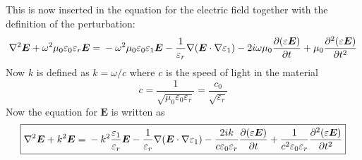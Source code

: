 \documentclass[10pt,a4paper]{eitExjobb}
\begin{document}
	This is now inserted in the equation for the electric field together with the definition of the perturbation:
	\begin{equation*}
	\nabla^2\bm{E} + \omega^2 \mu_0 \varepsilon_0 \varepsilon_r \bm{E} = \\
	-\omega^2 \mu_0 \varepsilon_0 \varepsilon_1 \bm{E} -\frac{1}{\varepsilon_r}\nabla(\bm{E} \cdot \nabla \varepsilon_1) - 2i\omega \mu_0 \frac{\partial (\varepsilon \bm{E})}{\partial t} + \mu_0 \frac{\partial^2 (\varepsilon \bm{E})}{\partial t^2}
	\end{equation*}
	Now $k$ is defined as $k = \omega/c$ where $c$ is the speed of light in the material
	\begin{equation*}
	c = \frac{1}{\sqrt{\mu_0 \varepsilon_0 \varepsilon_r}} = \frac{c_0}{\sqrt{\varepsilon_r}}
	\end{equation*}
	Now the equation for $\bm{E}$ is written as
	\begin{equation*}
	\boxed{
		\nabla^2\bm{E} + k^2 \bm{E} = \\
		-k^2 \frac{\varepsilon_1}{\varepsilon_r} \bm{E} -\frac{1}{\varepsilon_r}\nabla(\bm{E} \cdot \nabla \varepsilon_1) - \frac{2ik}{c\varepsilon_0\varepsilon_r} \frac{\partial (\varepsilon \bm{E})}{\partial t} + \frac{1}{c^2 \varepsilon_0 \varepsilon_r} \frac{\partial^2 (\varepsilon \bm{E})}{\partial t^2}
	}
	\end{equation*}
	
\end{document}
